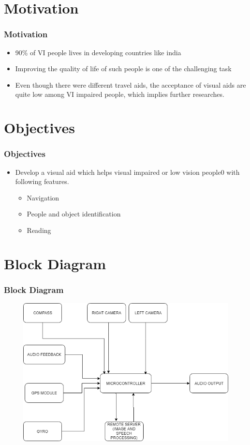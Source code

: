 \documentclass{beamer}
\begin{document}

\section{Motivation}
\begin{frame}
\frametitle{Motivation}
\begin{itemize}
\item
90\% of VI people lives in developing countries like india
\item
Improving the quality of life of such people is one of the challenging task
\item
Even though there were different travel aids, the acceptance of visual aids are quite low among VI impaired people, which implies further researches.
\end{itemize}
\end{frame}

\section{Objectives}
\begin{frame}
\frametitle{Objectives}
\begin{itemize}
\item
Develop a visual aid which helps visual impaired or low vision people0  with following features.
\begin{itemize}
\item
Navigation
\item
People and object identification
\item
Reading
\end{itemize}
\end{itemize}
\end{frame}


\section{Block Diagram}
\begin{frame}
\frametitle{Block Diagram}
\begin{figure}
\includegraphics[scale=.45]{block.png}
\end{figure}
\end{frame}
\end{document}
